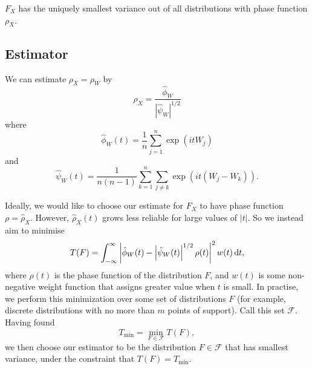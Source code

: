 	\begin{assumption}
	\label{assump:X has smallest variance}
		$F_X$ has the uniquely smallest variance out of all distributions with phase function $\rho_X$.
	\end{assumption}

	\subsection{Estimator}
	We can estimate $\rho_X = \rho_W$ by
	\begin{equation}
		\hat{\rho}_X = \frac{\hat{\phi}_W}{\left|\hat{\psi}_W\right|^{1/2}}
	\end{equation}
	where
	\begin{equation}
	\label{eq:define hat phi W}
		\hat{\phi}_W(t) = \frac{1}{n}\sum_{j = 1}^n \exp(it W_j)
	\end{equation}
	and 
	\begin{equation}
	\label{eq:define hat psi W}
		\hat{\psi}_W(t) = \frac{1}{n(n-1)} \sum_{k=1}^n \sum_{j \neq k} \exp(it (W_j - W_k)).
	\end{equation}

	Ideally, we would like to choose our estimate for $F_X$ to have phase function $\rho = \hat{\rho}_X$. However, $\hat{\rho}_X(t)$ grows less reliable for large values of $|t|$. So we instead aim to minimise 
	\begin{equation}
		T(F) = \int_{-\infty}^\infty \left| \hat{\phi}_W(t) - \left|\hat{\psi}_W(t)\right|^{1/2} \rho(t) \right|^2 w(t) \, \mathrm{d} t,
	\end{equation}
	where $\rho(t)$ is the phase function of the distribution $F$, and $w(t)$ is some non-negative weight function that assigns greater value when $t$ is small. In practise, we perform this minimization over some set of distributions $F$ (for example, discrete distributions with no more than $m$ points of support). Call this set $\mathscr{F}$. Having found
	\begin{equation}
		T_\mathrm{min} = \min_{F \in \mathscr{F}} T(F),
	\end{equation}
	we then choose our estimator to be the distribution $F \in \mathscr{F}$ that has smallest variance, under the constraint that $T(F) = T_\mathrm{min}$.

